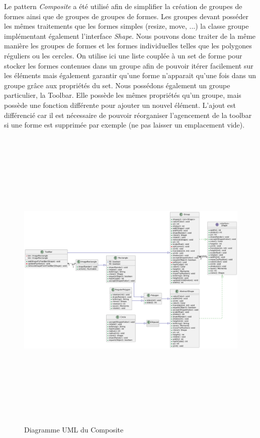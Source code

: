 \documentclass{article}
\begin{document}
Le pattern \textit{Composite} a été utilisé afin de simplifier la création de groupes de formes ainsi que de groupes de groupes de formes.
Les groupes devant posséder les mêmes traitements que les formes simples (resize, move, ...) la classe groupe implémentant également l'interface \textit{Shape}. Nous pouvons donc 
traiter de la même manière les groupes de formes et les formes individuelles telles que les polygones réguliers ou les cercles.  On utilise ici une liste couplée à un set de forme pour stocker
les formes contenues dans un groupe afin de pouvoir itérer facilement sur les éléments mais également garantir qu'une forme n'apparait qu'une fois dans un groupe grâce aux propriétés du set.
Nous possédons également un groupe particulier, la Toolbar. Elle possède les mêmes propriétés qu'un groupe, mais possède une fonction différente pour ajouter un nouvel élément. L'ajout est différencié
car il est nécessaire de pouvoir réorganiser l'agencement de la toolbar si une forme est supprimée par exemple (ne pas laisser un emplacement vide).
\begin{figure}[h]
    \centering
    \includegraphics[width=\textwidth,height=15.0cm,keepaspectratio]{Composite.png}
    \caption{Diagramme UML du Composite}
    \label{Composite}
\end{figure}
\FloatBarrier
\end{document}
